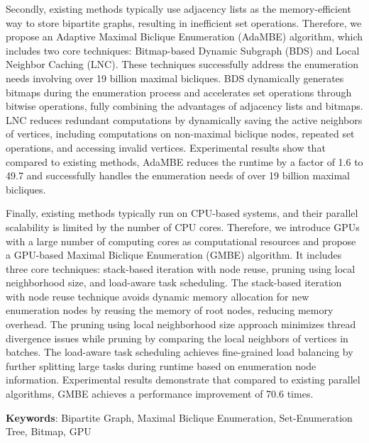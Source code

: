 Secondly, existing methods typically use adjacency lists as the memory-efficient way to store bipartite graphs, resulting in inefficient set operations. Therefore, we propose an Adaptive Maximal Biclique Enumeration (AdaMBE) algorithm, which includes two core techniques: Bitmap-based Dynamic Subgraph (BDS) and Local Neighbor Caching (LNC). These techniques successfully address the enumeration needs involving over 19 billion maximal bicliques. BDS dynamically generates bitmaps during the enumeration process and accelerates set operations through bitwise operations, fully combining the advantages of adjacency lists and bitmaps. LNC reduces redundant computations by dynamically saving the active neighbors of vertices, including computations on non-maximal biclique nodes, repeated set operations, and accessing invalid vertices. Experimental results show that compared to existing methods, AdaMBE reduces the runtime by a factor of 1.6 to 49.7 and successfully handles the enumeration needs of over 19 billion maximal bicliques.

Finally, existing methods typically run on CPU-based systems, and their parallel scalability is limited by the number of CPU cores. Therefore, we introduce GPUs with a large number of computing cores as computational resources and propose a GPU-based Maximal Biclique Enumeration (GMBE) algorithm. It includes three core techniques: stack-based iteration with node reuse, pruning using local neighborhood size, and load-aware task scheduling. The stack-based iteration with node reuse technique avoids dynamic memory allocation for new enumeration nodes by reusing the memory of root nodes, reducing memory overhead. The pruning using local neighborhood size approach minimizes thread divergence issues while pruning by comparing the local neighbors of vertices in batches. The load-aware task scheduling achieves fine-grained load balancing by further splitting large tasks during runtime based on enumeration node information. Experimental results demonstrate that compared to existing parallel algorithms, GMBE achieves a performance improvement of 70.6 times.

\vspace{\baselineskip}

\noindent \textbf{Keywords}: Bipartite Graph, Maximal Biclique Enumeration, Set-Enumeration Tree, Bitmap, GPU